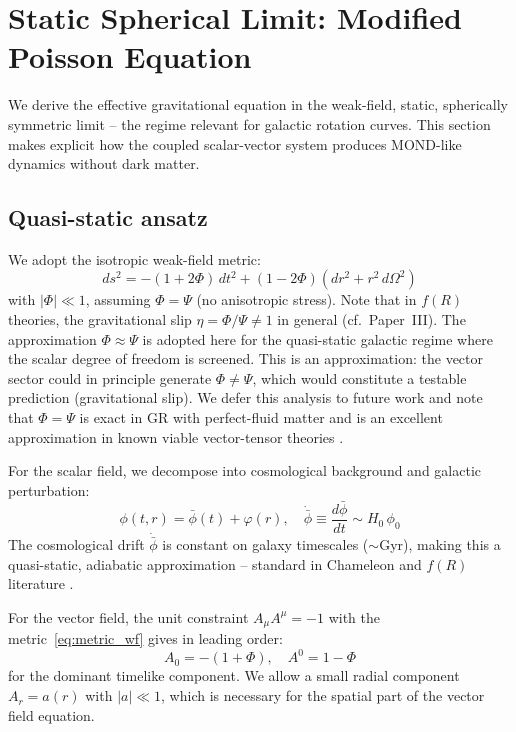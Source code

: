 \documentclass[aps,prd,twocolumn,superscriptaddress,nofootinbib]{revtex4-2}
\begin{document}
\section{Static Spherical Limit: Modified Poisson Equation}
\label{sec:spherical}

We derive the effective gravitational equation in the weak-field, static, spherically symmetric limit -- the regime relevant for galactic rotation curves. This section makes explicit how the coupled scalar-vector system produces MOND-like dynamics without dark matter.

\subsection{Quasi-static ansatz}
\label{sec:quasi_static}

We adopt the isotropic weak-field metric:
\begin{equation}
ds^2 = -(1 + 2\Phi)\,dt^2 + (1 - 2\Phi)(dr^2 + r^2\,d\Omega^2)
\label{eq:metric_wf}
\end{equation}
with $|\Phi| \ll 1$, assuming $\Phi = \Psi$ (no anisotropic stress). Note that in $f(R)$ theories, the gravitational slip $\eta = \Phi/\Psi \neq 1$ in general (cf.\ Paper~III). The approximation $\Phi \approx \Psi$ is adopted here for the quasi-static galactic regime where the scalar degree of freedom is screened. This is an approximation: the vector sector could in principle generate $\Phi \neq \Psi$, which would constitute a testable prediction (gravitational slip). We defer this analysis to future work and note that $\Phi = \Psi$ is exact in GR with perfect-fluid matter and is an excellent approximation in known viable vector-tensor theories \cite{Skordis2021}.

For the scalar field, we decompose into cosmological background and galactic perturbation:
\begin{equation}
\phi(t,r) = \bar{\phi}(t) + \varphi(r), \quad \dot{\bar{\phi}} \equiv \frac{d\bar{\phi}}{dt} \sim H_0\,\phi_0
\label{eq:phi_split}
\end{equation}
The cosmological drift $\dot{\bar{\phi}}$ is constant on galaxy timescales ($\sim$Gyr), making this a quasi-static, adiabatic approximation -- standard in Chameleon and $f(R)$ literature \cite{HuSawicki2007}.

For the vector field, the unit constraint $A_\mu A^\mu = -1$ with the metric~\eqref{eq:metric_wf} gives in leading order:
\begin{equation}
A_0 = -(1 + \Phi), \quad A^0 = 1 - \Phi
\label{eq:A0}
\end{equation}
for the dominant timelike component. We allow a small radial component $A_r = a(r)$ with $|a| \ll 1$, which is necessary for the spatial part of the vector field equation.
\end{document}
